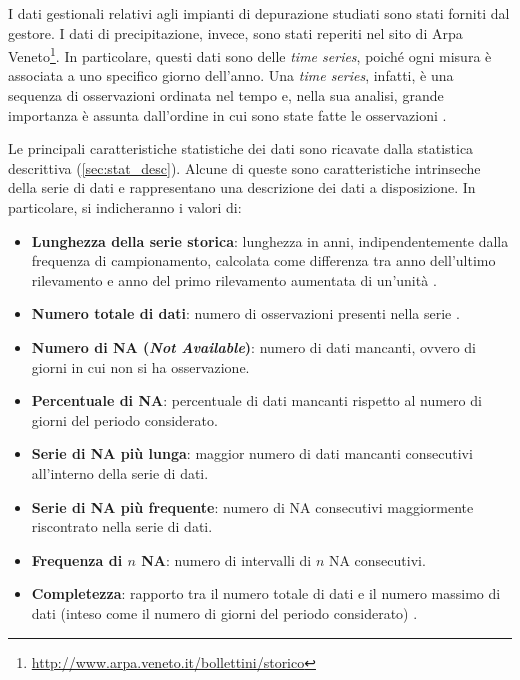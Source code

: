 I dati gestionali relativi agli impianti di depurazione studiati sono stati forniti dal gestore. I dati di precipitazione, invece, sono stati reperiti nel sito di Arpa Veneto\footnote{\url{http://www.arpa.veneto.it/bollettini/storico}}.
In particolare, questi dati sono delle \textit{time series}, poiché ogni misura è associata a uno specifico giorno dell'anno. Una \textit{time series}, infatti, è una sequenza di osservazioni ordinata nel tempo e, nella sua analisi, grande importanza è assunta dall'ordine in cui sono state fatte le osservazioni \cite{anderson1994statistical}.

Le principali caratteristiche statistiche dei dati sono ricavate dalla statistica descrittiva (\autoref{sec:stat_desc}). Alcune di queste sono caratteristiche intrinseche della serie di dati e rappresentano una descrizione dei dati a disposizione. In particolare, si indicheranno i valori di:
\begin{itemize}
	\item \textbf{Lunghezza della serie storica}: lunghezza in anni, indipendentemente dalla frequenza di campionamento, calcolata come differenza tra anno dell'ultimo rilevamento e anno del primo rilevamento aumentata di un'unità \cite{book}.
	\item \textbf{Numero totale di dati}: numero di osservazioni presenti nella serie \cite{book}.
	\item \textbf{Numero di NA (\textit{Not Available})}: numero di dati mancanti, ovvero di giorni in cui non si ha osservazione.
	\item \textbf{Percentuale di NA}: percentuale di dati mancanti rispetto al numero di giorni del periodo considerato.
	\item \textbf{Serie di NA più lunga}: maggior numero di dati mancanti consecutivi all'interno della serie di dati.
	\item \textbf{Serie di NA più frequente}: numero di NA consecutivi maggiormente riscontrato nella serie di dati.
	\item \textbf{Frequenza di $n$ NA}: numero di intervalli di $n$ NA consecutivi.   
	\item \textbf{Completezza}: rapporto tra il numero totale di dati e il numero massimo di dati (inteso come il numero di giorni del periodo considerato) \cite{book}.
	
\end{itemize}


